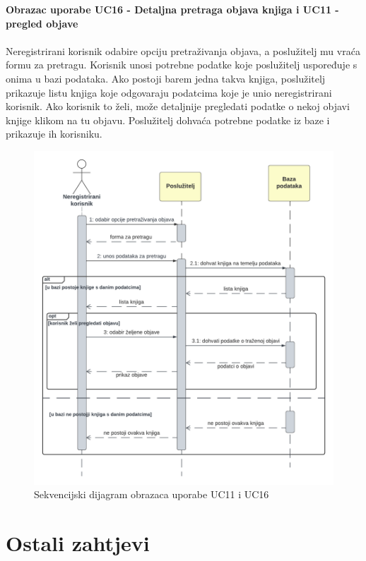 				\textbf{Obrazac uporabe UC16 - Detaljna pretraga objava knjiga i UC11 - pregled objave}\\\\
				Neregistrirani korisnik odabire opciju pretraživanja objava, a poslužitelj mu vraća formu za pretragu. Korisnik unosi potrebne podatke koje poslužitelj uspoređuje s onima u bazi podataka. Ako postoji barem jedna takva knjiga, poslužitelj prikazuje listu knjiga koje odgovaraju podatcima koje je unio neregistrirani korisnik. Ako korisnik to želi, može detaljnije pregledati podatke o nekoj objavi knjige klikom na tu objavu. Poslužitelj dohvaća potrebne podatke iz baze i prikazuje ih korisniku.\\
				
				\begin{figure}[htbp]
					\centering
					\includegraphics[width = \textwidth]{slike/sekvUC16.PNG}
					\caption{Sekvencijski dijagram obrazaca uporabe UC11 i UC16}
					\label{fig:enter-label}
				\end{figure}
				\eject
	
	
		\section{Ostali zahtjevi}
		
